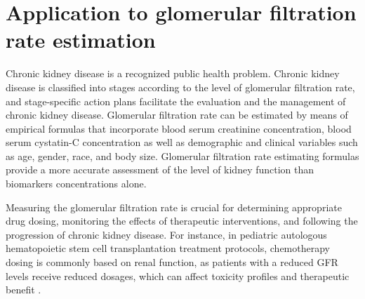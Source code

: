 \documentclass[10pt,final]{siamltex}
\begin{document}
\section{Application to glomerular filtration rate estimation}\label{gfr}
%
Chronic kidney disease is a recognized public health problem. Chronic kidney disease is classified into stages according to the level of glomerular filtration rate, and stage-specific action plans facilitate the evaluation and the management of chronic kidney disease.
Glomerular filtration rate can be estimated by means of empirical formulas that incorporate blood serum creatinine concentration, blood serum cystatin-C concentration as well as demographic and clinical variables such as age, gender, race, and body size. Glomerular filtration rate estimating formulas provide a more accurate assessment of the level of kidney function than biomarkers concentrations alone. %

Measuring the glomerular filtration rate is crucial for determining appropriate drug dosing, monitoring the effects of therapeutic interventions, and following the progression of chronic kidney disease. For instance, in pediatric autologous hematopoietic stem cell transplantation treatment protocols, chemotherapy dosing is commonly based on renal function, as patients with a reduced GFR levels receive reduced dosages, which can affect toxicity profiles and therapeutic benefit \cite{laskin}.
%
\end{document}
